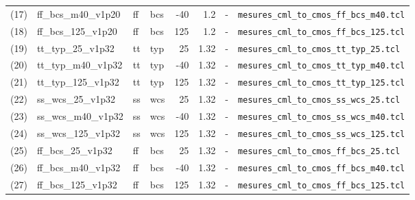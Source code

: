 \documentclass[a4paper,10pt,landscape]{article}
\begin{document}
\begin{longtable}{rlllrrrl}
(17) & ff\_bcs\_m40\_v1p20 & ff & bcs & -40 & 1.2 & - & {\small\texttt{mesures\_cml\_to\_cmos\_ff\_bcs\_m40.tcl}} \\
(18) & ff\_bcs\_125\_v1p20 & ff & bcs & 125 & 1.2 & - & {\small\texttt{mesures\_cml\_to\_cmos\_ff\_bcs\_125.tcl}} \\
(19) & tt\_typ\_25\_v1p32 & tt & typ & 25 & 1.32 & - & {\small\texttt{mesures\_cml\_to\_cmos\_tt\_typ\_25.tcl}} \\
(20) & tt\_typ\_m40\_v1p32 & tt & typ & -40 & 1.32 & - & {\small\texttt{mesures\_cml\_to\_cmos\_tt\_typ\_m40.tcl}} \\
(21) & tt\_typ\_125\_v1p32 & tt & typ & 125 & 1.32 & - & {\small\texttt{mesures\_cml\_to\_cmos\_tt\_typ\_125.tcl}} \\
(22) & ss\_wcs\_25\_v1p32 & ss & wcs & 25 & 1.32 & - & {\small\texttt{mesures\_cml\_to\_cmos\_ss\_wcs\_25.tcl}} \\
(23) & ss\_wcs\_m40\_v1p32 & ss & wcs & -40 & 1.32 & - & {\small\texttt{mesures\_cml\_to\_cmos\_ss\_wcs\_m40.tcl}} \\
(24) & ss\_wcs\_125\_v1p32 & ss & wcs & 125 & 1.32 & - & {\small\texttt{mesures\_cml\_to\_cmos\_ss\_wcs\_125.tcl}} \\
(25) & ff\_bcs\_25\_v1p32 & ff & bcs & 25 & 1.32 & - & {\small\texttt{mesures\_cml\_to\_cmos\_ff\_bcs\_25.tcl}} \\
(26) & ff\_bcs\_m40\_v1p32 & ff & bcs & -40 & 1.32 & - & {\small\texttt{mesures\_cml\_to\_cmos\_ff\_bcs\_m40.tcl}} \\
(27) & ff\_bcs\_125\_v1p32 & ff & bcs & 125 & 1.32 & - & {\small\texttt{mesures\_cml\_to\_cmos\_ff\_bcs\_125.tcl}} \\
\bottomrule\end{longtable}
\end{document}
